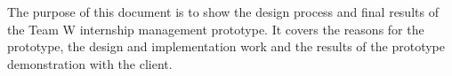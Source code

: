 The purpose of this document is to show the design process and final results of the Team W internship 
management prototype. It covers the reasons for the prototype, the design and implementation work
and the results of the prototype demonstration with the client.